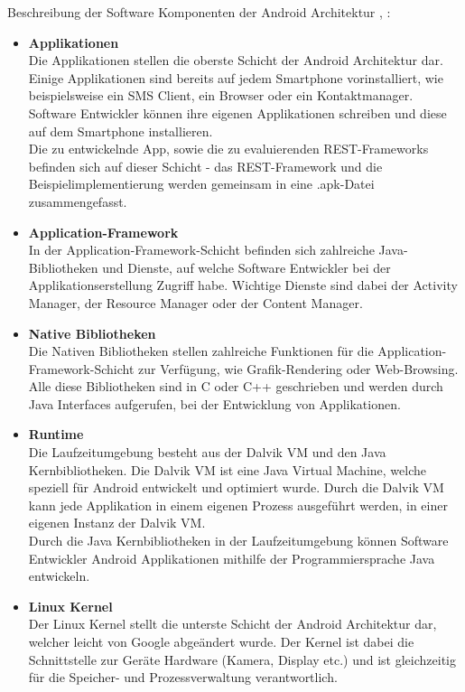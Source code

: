 Beschreibung der Software Komponenten der Android Architektur \cite{overviewAndroid:singh}, \cite{androidTutorialOS}: 
\begin{itemize}
	\item \textbf{Applikationen}\\
	Die Applikationen stellen die oberste Schicht der Android Architektur dar. Einige Applikationen sind bereits auf jedem Smartphone vorinstalliert, wie beispielsweise ein SMS Client,  ein Browser oder ein Kontaktmanager. Software Entwickler können ihre eigenen Applikationen schreiben und diese auf dem Smartphone installieren.\\
	Die zu entwickelnde App, sowie die zu evaluierenden REST-Frameworks befinden sich auf dieser Schicht - das REST-Framework und die Beispielimplementierung werden gemeinsam in eine .apk-Datei zusammengefasst.
	\item \textbf{Application-Framework}\\
    In der Application-Framework-Schicht befinden sich zahlreiche Java-Bibliotheken und Dienste, auf welche Software Entwickler bei der Applikationserstellung Zugriff habe. Wichtige Dienste sind dabei der Activity Manager, der Resource Manager oder der Content Manager.
	\item \textbf{Native Bibliotheken}\\
	Die Nativen Bibliotheken stellen zahlreiche Funktionen für die Application-Framework-Schicht zur Verfügung, wie Grafik-Rendering oder Web-Browsing. Alle diese Bibliotheken sind in C oder C++ geschrieben und werden durch Java Interfaces aufgerufen, bei der Entwicklung von Applikationen.
	\item \textbf{Runtime}\\
	Die Laufzeitumgebung besteht aus der Dalvik \acrfull{VM} und den Java Kernbibliotheken. Die Dalvik VM ist eine Java Virtual Machine, welche speziell für Android entwickelt und optimiert wurde.  Durch die  Dalvik VM kann jede Applikation in einem eigenen Prozess ausgeführt werden, in einer eigenen Instanz der Dalvik VM. \\
	Durch die Java Kernbibliotheken in der Laufzeitumgebung können Software Entwickler Android Applikationen mithilfe der Programmiersprache Java entwickeln.   
	\item \textbf{Linux Kernel}\\
	Der Linux Kernel stellt die unterste Schicht der Android Architektur dar, welcher leicht von Google abgeändert wurde. Der Kernel ist dabei die Schnittstelle zur Geräte Hardware (Kamera, Display etc.) und ist gleichzeitig für die Speicher- und Prozessverwaltung verantwortlich.
\end{itemize}
	
